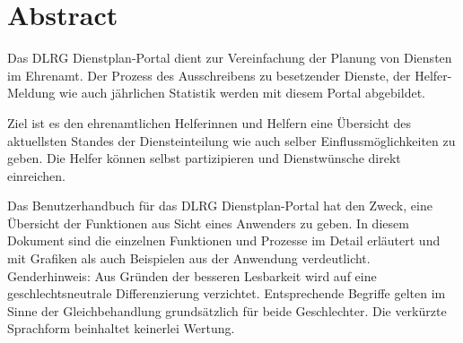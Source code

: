 \chapter*{Abstract} %

Das DLRG Dienstplan-Portal dient zur Vereinfachung der Planung von Diensten im Ehrenamt. Der Prozess des Ausschreibens zu besetzender Dienste, der Helfer-Meldung wie auch jährlichen Statistik werden mit diesem Portal abgebildet.

\vspace*{5mm} \noindent Ziel ist es den ehrenamtlichen Helferinnen und Helfern eine Übersicht des aktuellsten Standes der Diensteinteilung wie auch selber Einflussmöglichkeiten zu geben. Die Helfer können selbst  partizipieren und Dienstwünsche direkt einreichen. 

\vspace*{5mm} \noindent Das Benutzerhandbuch für das DLRG Dienstplan-Portal hat den Zweck, eine Übersicht der Funktionen aus Sicht eines Anwenders zu geben. In diesem Dokument sind die einzelnen Funktionen und Prozesse im Detail erläutert und mit Grafiken als auch Beispielen aus der Anwendung verdeutlicht. \\
Genderhinweis: Aus Gründen der besseren Lesbarkeit wird auf eine geschlechtsneutrale Differenzierung verzichtet. Entsprechende Begriffe gelten im Sinne der Gleichbehandlung grundsätzlich für beide Geschlechter. Die verkürzte Sprachform beinhaltet keinerlei Wertung.